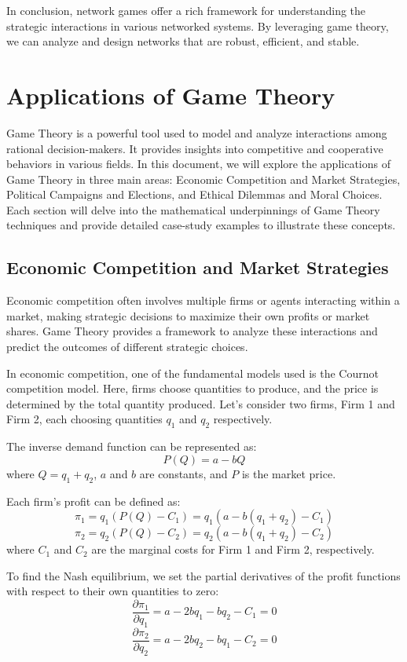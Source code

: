 \documentclass[12pt]{book} %
\begin{document}
In conclusion, network games offer a rich framework for understanding the strategic interactions in various networked systems. By leveraging game theory, we can analyze and design networks that are robust, efficient, and stable.


\section{Applications of Game Theory}
Game Theory is a powerful tool used to model and analyze interactions among rational decision-makers. It provides insights into competitive and cooperative behaviors in various fields. In this document, we will explore the applications of Game Theory in three main areas: Economic Competition and Market Strategies, Political Campaigns and Elections, and Ethical Dilemmas and Moral Choices. Each section will delve into the mathematical underpinnings of Game Theory techniques and provide detailed case-study examples to illustrate these concepts.

\subsection{Economic Competition and Market Strategies}
Economic competition often involves multiple firms or agents interacting within a market, making strategic decisions to maximize their own profits or market shares. Game Theory provides a framework to analyze these interactions and predict the outcomes of different strategic choices.

In economic competition, one of the fundamental models used is the Cournot competition model. Here, firms choose quantities to produce, and the price is determined by the total quantity produced. Let's consider two firms, Firm 1 and Firm 2, each choosing quantities \( q_1 \) and \( q_2 \) respectively.

The inverse demand function can be represented as:
\[
P(Q) = a - bQ
\]
where \( Q = q_1 + q_2 \), \( a \) and \( b \) are constants, and \( P \) is the market price.

Each firm's profit can be defined as:
\[
\pi_1 = q_1 (P(Q) - C_1) = q_1 (a - b(q_1 + q_2) - C_1)
\]
\[
\pi_2 = q_2 (P(Q) - C_2) = q_2 (a - b(q_1 + q_2) - C_2)
\]
where \( C_1 \) and \( C_2 \) are the marginal costs for Firm 1 and Firm 2, respectively.

To find the Nash equilibrium, we set the partial derivatives of the profit functions with respect to their own quantities to zero:
\[
\frac{\partial \pi_1}{\partial q_1} = a - 2bq_1 - bq_2 - C_1 = 0
\]
\[
\frac{\partial \pi_2}{\partial q_2} = a - 2bq_2 - bq_1 - C_2 = 0
\]
\end{document}
